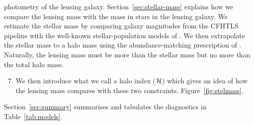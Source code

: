 \begin{itemize}
  photometry of the lensing galaxy.  Section~\ref{sec:stellar-mass}
  explains how we compare the lensing mass with the mass in stars in
  the lensing galaxy.  We estimate the stellar mass by comparing
  galaxy magnitudes from the CFHTLS pipeline with the well-known
  stellar-population models of \cite{2003MNRAS.344.1000B}.  We then
  extrapolate the stellar mass to a halo mass using the
  abundance-matching prescription of \cite{2010ApJ...710..903M}.
  Naturally, the lensing mass must be more than the stellar mass but
  no more than the total halo mass.
\begin{enumerate}
\setcounter{enumi}{6}
\item We then introduce what we call a halo index ($\mathcal{H}$) which
  gives an idea of how the lensing mass compares with these two
  constraints.  Figure~\ref{fig:stelmass}.
\end{enumerate}
\end{itemize}

Section~\ref{sec:summary} summarises and tabulates the diagnostics in
Table~\ref{tab:models}.




